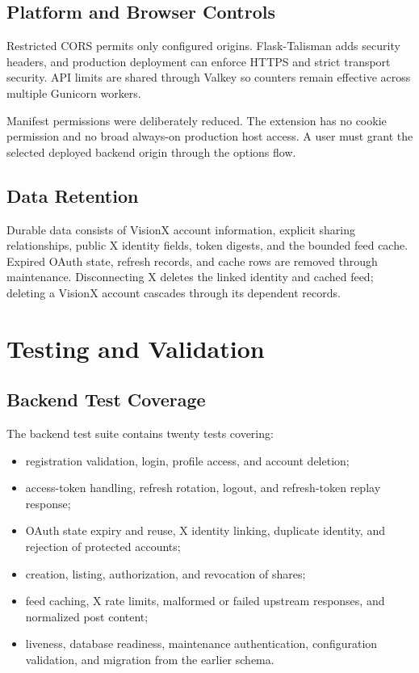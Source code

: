 \documentclass[11pt,a4paper]{report}
\begin{document}
\section{Platform and Browser Controls}
Restricted CORS permits only configured origins. Flask-Talisman adds security
headers, and production deployment can enforce HTTPS and strict transport
security. API limits are shared through Valkey so counters remain effective
across multiple Gunicorn workers.

Manifest permissions were deliberately reduced. The extension has no cookie
permission and no broad always-on production host access. A user must grant
the selected deployed backend origin through the options flow.

\section{Data Retention}
Durable data consists of VisionX account information, explicit sharing
relationships, public X identity fields, token digests, and the bounded feed
cache. Expired OAuth state, refresh records, and cache rows are removed through
maintenance. Disconnecting X deletes the linked identity and cached feed;
deleting a VisionX account cascades through its dependent records.

\chapter{Testing and Validation}

\section{Backend Test Coverage}
The backend test suite contains twenty tests covering:

\begin{itemize}
  \item registration validation, login, profile access, and account deletion;
  \item access-token handling, refresh rotation, logout, and refresh-token
  replay response;
  \item OAuth state expiry and reuse, X identity linking, duplicate identity,
  and rejection of protected accounts;
  \item creation, listing, authorization, and revocation of shares;
  \item feed caching, X rate limits, malformed or failed upstream responses,
  and normalized post content;
  \item liveness, database readiness, maintenance authentication, configuration
  validation, and migration from the earlier schema.
\end{itemize}
\end{document}
